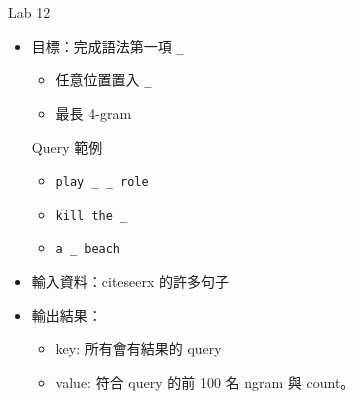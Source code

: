 \documentclass[12pt,c]{beamer}
\begin{document}
\begin{frame}{Lab 12}
  \begin{itemize}
  \item 目標：完成語法第一項 \lstinline/_/
    \begin{itemize}
    \item 任意位置置入 \lstinline/_/
    \item 最長 4-gram
    \end{itemize}
    \begin{block}{Query 範例}
      \begin{itemize}
      \item \lstinline/play _ _ role/
      \item \lstinline/kill the _/
      \item \lstinline/a _ beach/
      \end{itemize}
    \end{block}
  \item 輸入資料：citeseerx 的許多句子
  \item 輸出結果：
    \begin{itemize}
    \item key: 所有會有結果的 query
    \item value: 符合 query 的前 100 名 ngram 與 count。
    \end{itemize}
  \end{itemize}

\end{frame}
\end{document}
